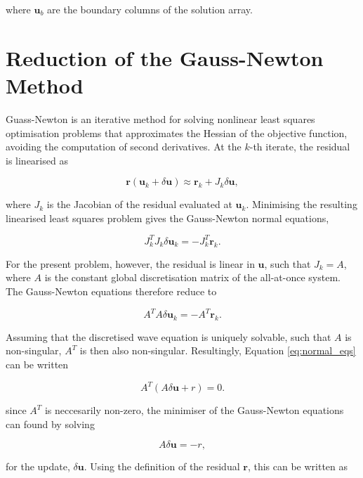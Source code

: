 \documentclass[final-report]{report-template}
\begin{document}
where $\mathbf{u}_b$ are the boundary columns of the solution array.

\section{Reduction of the Gauss-Newton Method}
\label{app:gn}
Guass-Newton is an iterative method for solving nonlinear least squares optimisation problems that approximates the Hessian of the objective function, avoiding the computation of second derivatives. At the $k$-th iterate, the residual is linearised as 

\begin{equation}
    \mathbf{r}(\mathbf{u}_k+\delta\mathbf{u}) \approx \mathbf{r}_k + J_k\delta\mathbf{u},
\end{equation}

where $J_k$ is the Jacobian of the residual evaluated at $\mathbf{u}_k$. Minimising the resulting linearised least squares problem gives the Gauss-Newton normal equations,

\begin{equation}
    J_k^T J_k \delta \mathbf{u}_k = - J_k^T \mathbf{r}_k.
    \label{eq:normal_eqs}
\end{equation}

For the present problem, however, the residual is linear in $\mathbf{u}$, such that $J_k = A$, where $A$ is the constant global discretisation matrix of the all-at-once system. The Gauss-Newton equations therefore reduce to

\begin{equation}
    A^T A\delta \mathbf{u}_k = - A^T \mathbf{r}_k.
\end{equation}

Assuming that the discretised wave equation is uniquely solvable, such that $A$ is non-singular, $A^T$ is then also non-singular. Resultingly, Equation \eqref{eq:normal_eqs} can be written

\begin{equation}
    A^T(A\delta \mathbf{u} + r) = 0.
\end{equation}

since $A^T$ is neccesarily non-zero, the minimiser of the Gauss-Newton equations can found by solving

\begin{equation}
    A\delta \mathbf{u} = - r,
\end{equation}

for the update, $\delta \mathbf{u}$. Using the definition of the residual $\mathbf{r}$, this can be written as
\end{document}
